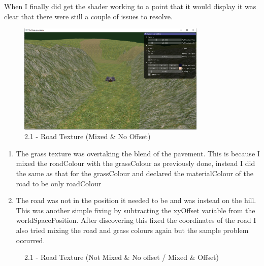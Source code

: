 \documentclass[a4 paper, 12pt]{article}
\begin{document}
When I finally did get the shader working to a point that it would display it was clear that there were still a couple of issues to resolve.

\begin{figure} [H]
    \centering
    \includegraphics[width=0.8\textwidth, frame]
        {./images/2.1_c_1.PNG}
    \caption{2.1 - Road Texture (Mixed \& No Offset)}   
\end{figure}

\begin{enumerate}
    \item The grass texture was overtaking the blend of the pavement. This is because I mixed the roadColour with the grassColour as previously done, instead I did the same as that for the grassColour and declared the materialColour of the road to be only roadColour
    \item The road was not in the position it needed to be and was instead on the hill. This was another simple fixing by subtracting the xyOffset variable from the worldSpacePosition. After discovering this fixed the coordinates of the road I also tried mixing the road and grass colours again but the sample problem occurred.
\end{enumerate}

\begin{figure} [H]
        \caption{2.1 - Road Texture (Not Mixed \& No offset / Mixed \& Offset)}   
\end{figure}
\end{document}
